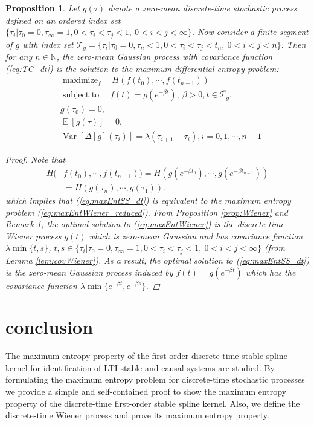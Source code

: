 \documentclass{article}
\DeclareMathOperator*{\maximize}{maximize}
\DeclareMathOperator*{\subj}{subject \  to}
\DeclareMathOperator*{\var}{Var}
\newtheorem{prop}{Proposition}
\newcommand{\E}{\mathop{\mathbb E}}
\begin{document}
\begin{prop}
\label{prop:DTstablespline} Let $g(\tau)$ denote a zero-mean
discrete-time stochastic process defined on an ordered index set
$\{\tau_i|\tau_0=0,\tau_\infty=1, 0< \tau_i< \tau_j< 1,\ 0< i <j <
\infty\}$. Now consider a finite segment of $g$ with index set
$\mathcal T_g =\{\tau_i|\tau_0=0,\tau_n<1, 0< \tau_i< \tau_j<t_n,\
0< i <j < n\}$. Then for any $n\in\mathbb N$, the zero-mean Gaussian process with
covariance function (\ref{eq:TC_dt}) is the solution to the maximum
differential entropy problem:
\begin{equation}
\label{eq:maxEntSS_dt}
\begin{aligned}
& \maximize_f \quad  H(f(t_0),\cdots,f(t_{n-1}))\\
& \subj   \quad f(t)=g(e^{-\beta t}),\ \beta>0,
t\in\overline{\mathcal T_g} ,\\
&  g(\tau_0)=0,\\
&\E\left[g(\tau)\right]=0,\\
& \var\left[\Delta[g](\tau_i)\right]=\lambda
(\tau_{i+1}-\tau_{i}), i=0,1, \cdots,n-1
\end{aligned}
\end{equation}
\begin{proof} Note that \begin{align}
H(&f(t_0),\cdots,f(t_{n-1})) = H(g(e^{-\beta
t_0}),\cdots,g(e^{-\beta t_{n-1}}))\nonumber\\&=
H(g(\tau_{n}),\cdots,g(\tau_1)).
\end{align}
which implies that (\ref{eq:maxEntSS_dt}) is equivalent to the
maximum entropy problem (\ref{eq:maxEntWiener_reduced}). From
Proposition \ref{prop:Wiener} and Remark 1, the optimal solution to
(\ref{eq:maxEntWiener}) is the discrete-time Wiener process $g(t)$
which is zero-mean Gaussian and has covariance function
$\lambda\min\{t,s\}$, $t,s\in\{\tau_i|\tau_0=0,\tau_\infty=1, 0<
\tau_i< \tau_j< 1,\ 0< i <j < \infty\}$ (from Lemma
\ref{lem:covWiener}). As a result, the optimal solution to
(\ref{eq:maxEntSS_dt}) is the zero-mean Gaussian process induced by
$f(t)=g(e^{-\beta t})$ which has the covariance function
$\lambda\min\{e^{-\beta t},e^{-\beta s}\}$.
\end{proof}
\end{prop}


\section{conclusion}
The maximum entropy property of the first-order discrete-time stable spline
kernel for identification of LTI stable and causal systems are
studied. By formulating the maximum entropy problem for
discrete-time stochastic processes we provide a simple and
self-contained proof to show  the maximum entropy property of the
discrete-time first-order stable spline kernel. Also, we define the
discrete-time Wiener process and prove its maximum entropy property.



\end{document}

